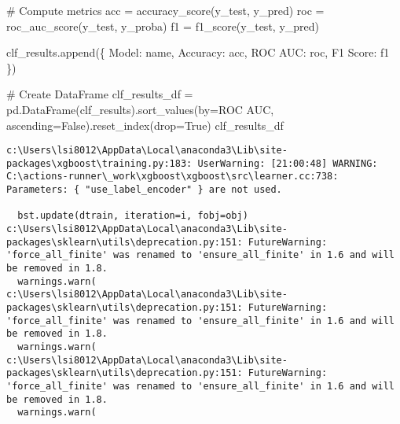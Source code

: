 \documentclass[
  letterpaper,
  DIV=11,
  numbers=noendperiod]{scrreprt}
\newenvironment{Shaded}{\begin{snugshade}}{\end{snugshade}}
\newcommand{\CommentTok}[1]{\textcolor[rgb]{0.37,0.37,0.37}{#1}}
\newcommand{\NormalTok}[1]{\textcolor[rgb]{0.00,0.23,0.31}{#1}}
\newcommand{\OperatorTok}[1]{\textcolor[rgb]{0.37,0.37,0.37}{#1}}
\newcommand{\StringTok}[1]{\textcolor[rgb]{0.13,0.47,0.30}{#1}}
\newcommand{\VariableTok}[1]{\textcolor[rgb]{0.07,0.07,0.07}{#1}}
\begin{document}
\begin{Shaded}
\begin{Highlighting}[]
    \CommentTok{\# Compute metrics}
\NormalTok{    acc }\OperatorTok{=}\NormalTok{ accuracy\_score(y\_test, y\_pred)}
\NormalTok{    roc }\OperatorTok{=}\NormalTok{ roc\_auc\_score(y\_test, y\_proba)}
\NormalTok{    f1 }\OperatorTok{=}\NormalTok{ f1\_score(y\_test, y\_pred)}
    
\NormalTok{    clf\_results.append(\{}
        \StringTok{\textquotesingle{}Model\textquotesingle{}}\NormalTok{: name,}
        \StringTok{\textquotesingle{}Accuracy\textquotesingle{}}\NormalTok{: acc,}
        \StringTok{\textquotesingle{}ROC AUC\textquotesingle{}}\NormalTok{: roc,}
        \StringTok{\textquotesingle{}F1 Score\textquotesingle{}}\NormalTok{: f1}
\NormalTok{    \})}

\CommentTok{\# Create DataFrame}
\NormalTok{clf\_results\_df }\OperatorTok{=}\NormalTok{ pd.DataFrame(clf\_results).sort\_values(by}\OperatorTok{=}\StringTok{\textquotesingle{}ROC AUC\textquotesingle{}}\NormalTok{, ascending}\OperatorTok{=}\VariableTok{False}\NormalTok{).reset\_index(drop}\OperatorTok{=}\VariableTok{True}\NormalTok{)}
\NormalTok{clf\_results\_df}
\end{Highlighting}
\end{Shaded}

\begin{verbatim}
c:\Users\lsi8012\AppData\Local\anaconda3\Lib\site-packages\xgboost\training.py:183: UserWarning: [21:00:48] WARNING: C:\actions-runner\_work\xgboost\xgboost\src\learner.cc:738: 
Parameters: { "use_label_encoder" } are not used.

  bst.update(dtrain, iteration=i, fobj=obj)
c:\Users\lsi8012\AppData\Local\anaconda3\Lib\site-packages\sklearn\utils\deprecation.py:151: FutureWarning: 'force_all_finite' was renamed to 'ensure_all_finite' in 1.6 and will be removed in 1.8.
  warnings.warn(
c:\Users\lsi8012\AppData\Local\anaconda3\Lib\site-packages\sklearn\utils\deprecation.py:151: FutureWarning: 'force_all_finite' was renamed to 'ensure_all_finite' in 1.6 and will be removed in 1.8.
  warnings.warn(
c:\Users\lsi8012\AppData\Local\anaconda3\Lib\site-packages\sklearn\utils\deprecation.py:151: FutureWarning: 'force_all_finite' was renamed to 'ensure_all_finite' in 1.6 and will be removed in 1.8.
  warnings.warn(
\end{verbatim}
\end{document}
